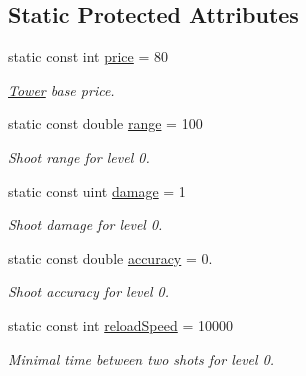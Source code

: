 \subsection*{Static Protected Attributes}
\begin{DoxyCompactItemize}
\item 
\mbox{\label{class_tower_a42dd5e95ec52d98ec39a97dc6dcfd81d}} 
static const int \mbox{\hyperlink{class_tower_a42dd5e95ec52d98ec39a97dc6dcfd81d}{price}} = 80
\begin{DoxyCompactList}\small\item\em \mbox{\hyperlink{class_tower}{Tower}} base price. \end{DoxyCompactList}\item 
\mbox{\label{class_tower_a985a164bdc82770fc7d9e1917d4bfa31}} 
static const double \mbox{\hyperlink{class_tower_a985a164bdc82770fc7d9e1917d4bfa31}{range}} = 100
\begin{DoxyCompactList}\small\item\em Shoot range for level 0. \end{DoxyCompactList}\item 
\mbox{\label{class_tower_a8941df1326452bdd59aaff556f86d79e}} 
static const uint \mbox{\hyperlink{class_tower_a8941df1326452bdd59aaff556f86d79e}{damage}} = 1
\begin{DoxyCompactList}\small\item\em Shoot damage for level 0. \end{DoxyCompactList}\item 
\mbox{\label{class_tower_a31b5581d0d9b6a83ea6531235485248c}} 
static const double \mbox{\hyperlink{class_tower_a31b5581d0d9b6a83ea6531235485248c}{accuracy}} = 0.
\begin{DoxyCompactList}\small\item\em Shoot accuracy for level 0. \end{DoxyCompactList}\item 
\mbox{\label{class_tower_a19a5da9ad30ec4017435a5694e2340b4}} 
static const int \mbox{\hyperlink{class_tower_a19a5da9ad30ec4017435a5694e2340b4}{reload\+Speed}} = 10000
\begin{DoxyCompactList}\small\item\em Minimal time between two shots for level 0. \end{DoxyCompactList}\item 

\end{DoxyCompactItemize}
